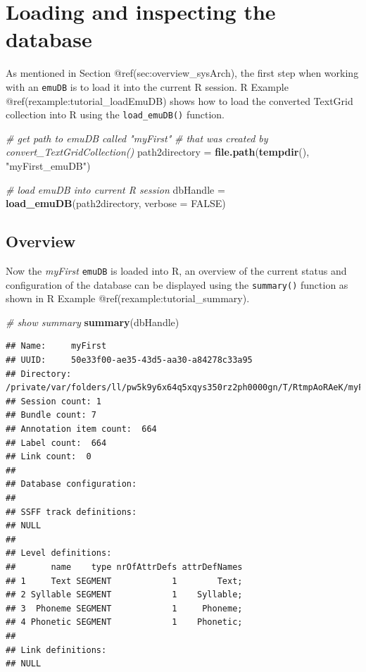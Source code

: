 \documentclass[]{book}
\newenvironment{Shaded}{\begin{snugshade}}{\end{snugshade}}
\newcommand{\KeywordTok}[1]{\textcolor[rgb]{0.13,0.29,0.53}{\textbf{{#1}}}}
\newcommand{\DataTypeTok}[1]{\textcolor[rgb]{0.13,0.29,0.53}{{#1}}}
\newcommand{\StringTok}[1]{\textcolor[rgb]{0.31,0.60,0.02}{{#1}}}
\newcommand{\CommentTok}[1]{\textcolor[rgb]{0.56,0.35,0.01}{\textit{{#1}}}}
\newcommand{\OtherTok}[1]{\textcolor[rgb]{0.56,0.35,0.01}{{#1}}}
\newcommand{\NormalTok}[1]{{#1}}
\theoremstyle{definition}
\theoremstyle{definition}
\theoremstyle{definition}
\theoremstyle{remark}
\begin{document}
\section{Loading and inspecting the
database}\label{loading-and-inspecting-the-database}

As mentioned in Section @ref(sec:overview\_sysArch), the first step when
working with an \texttt{emuDB} is to load it into the current R session.
R Example @ref(rexample:tutorial\_loadEmuDB) shows how to load the
converted TextGrid collection into R using the \texttt{load\_emuDB()}
function.

\begin{Shaded}
\begin{Highlighting}[]
\CommentTok{# get path to emuDB called "myFirst"}
\CommentTok{# that was created by convert_TextGridCollection()}
\NormalTok{path2directory =}\StringTok{ }\KeywordTok{file.path}\NormalTok{(}\KeywordTok{tempdir}\NormalTok{(), }\StringTok{"myFirst_emuDB"}\NormalTok{)}

\CommentTok{# load emuDB into current R session}
\NormalTok{dbHandle =}\StringTok{ }\KeywordTok{load_emuDB}\NormalTok{(path2directory, }\DataTypeTok{verbose =} \OtherTok{FALSE}\NormalTok{)}
\end{Highlighting}
\end{Shaded}

\subsection{Overview}\label{overview}

Now the \emph{myFirst} \texttt{emuDB} is loaded into R, an overview of
the current status and configuration of the database can be displayed
using the \texttt{summary()} function as shown in R Example
@ref(rexample:tutorial\_summary).

\begin{Shaded}
\begin{Highlighting}[]
\CommentTok{# show summary}
\KeywordTok{summary}\NormalTok{(dbHandle)}
\end{Highlighting}
\end{Shaded}

\begin{verbatim}
## Name:     myFirst 
## UUID:     50e33f00-ae35-43d5-aa30-a84278c33a95 
## Directory:    /private/var/folders/ll/pw5k9y6x64q5xqys350rz2ph0000gn/T/RtmpAoRAeK/myFirst_emuDB 
## Session count: 1 
## Bundle count: 7 
## Annotation item count:  664 
## Label count:  664 
## Link count:  0 
## 
## Database configuration:
## 
## SSFF track definitions:
## NULL
## 
## Level definitions:
##       name    type nrOfAttrDefs attrDefNames
## 1     Text SEGMENT            1        Text;
## 2 Syllable SEGMENT            1    Syllable;
## 3  Phoneme SEGMENT            1     Phoneme;
## 4 Phonetic SEGMENT            1    Phonetic;
## 
## Link definitions:
## NULL
\end{verbatim}
\end{document}
